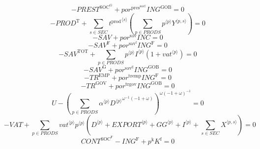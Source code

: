 \begin{equation}
-{P\!R\!E\!S\!T}^{\mathrm{SOC}^{\mathrm{G}}} + {{p\!o\!r}^{\mathrm{pres}^{\mathrm{soc}^{\mathrm{g}}}}} {{I\!N\!G}^{\mathrm{GOB}}} = 0
\end{equation}
\begin{equation}
-{P\!R\!O\!D}^{\mathrm{T}} + \sum_{s\in {S\!E\!C}} {{t^{\mathrm{prod}}}^{\langle s\rangle}} \left(\sum_{p\in {P\!R\!O\!D\!S}} {{p}^{\langle p\rangle}} {{Y}^{\langle p,s\rangle}}\right) = 0
\end{equation}
\begin{equation}
-{S\!A\!V} + {{p\!o\!r}^{\mathrm{sav}}} {{I\!N\!C}} = 0
\end{equation}
\begin{equation}
-{S\!A\!V}^{\mathrm{F}} + {{p\!o\!r}^{\mathrm{sav}^{\mathrm{f}}}} {{I\!N\!G}^{\mathrm{F}}} = 0
\end{equation}
\begin{equation}
-{S\!A\!V}^{\mathrm{TOT}} + \sum_{p\in {P\!R\!O\!D\!S}} {{p}^{\langle p\rangle}} {{I}^{\langle p\rangle}} \left(1 + {{v\!a\!t}}^{\langle p\rangle}\right) = 0
\end{equation}
\begin{equation}
-{S\!A\!V}^{\mathrm{G}} + {{p\!o\!r}^{\mathrm{sav}^{\mathrm{g}}}} {{I\!N\!G}^{\mathrm{GOB}}} = 0
\end{equation}
\begin{equation}
-{T\!R}^{\mathrm{EMP}} + {{p\!o\!r}^{\mathrm{tremp}}} {{I\!N\!G}^{\mathrm{F}}} = 0
\end{equation}
\begin{equation}
-{T\!R}^{\mathrm{GOV}} + {{p\!o\!r}^{\mathrm{trgov}}} {{I\!N\!G}^{\mathrm{GOB}}} = 0
\end{equation}
\begin{equation}
U - \left(\sum_{p\in {P\!R\!O\!D\!S}} {{\alpha}^{\langle p\rangle}} {{{D}^{\langle p\rangle}}^{{\omega}^{-1} \left(-1 + \omega\right)}}\right)^{{\omega} \left(-1 + \omega\right)^{-1}} = 0
\end{equation}
\begin{equation}
-{V\!A\!T} + \sum_{p\in {P\!R\!O\!D\!S}} {{{v\!a\!t}}^{\langle p\rangle}} {{p}^{\langle p\rangle}} \left({D}^{\langle p\rangle} + {{E\!X\!P\!O\!R\!T}}^{\langle p\rangle} + {{G\!G}}^{\langle p\rangle} + {I}^{\langle p\rangle} + \sum_{s\in {S\!E\!C}} {X}^{\langle p,s\rangle}\right) = 0
\end{equation}
\begin{equation}
{C\!O\!N\!T}^{\mathrm{SOC}^{\mathrm{F}}} - {I\!N\!G}^{\mathrm{F}} + {p^{\mathrm{k}}} {K^{\mathrm{f}}} = 0
\end{equation}
